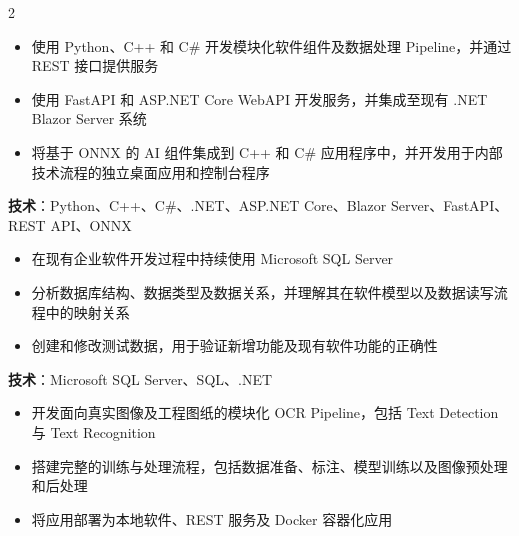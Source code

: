 \documentclass[10pt,a4paper,withhyper]{../altacv}
\begin{document}
\begin{paracol}{2}

  \vspace{1.0em}

  \begin{itemize}
    \item 使用 Python、C++ 和 C\# 开发模块化软件组件及数据处理 Pipeline，并通过 REST 接口提供服务
    \item 使用 FastAPI 和 ASP.NET Core WebAPI 开发服务，并集成至现有 .NET Blazor Server 系统
    \item 将基于 ONNX 的 AI 组件集成到 C++ 和 C\# 应用程序中，并开发用于内部技术流程的独立桌面应用和控制台程序
  \end{itemize}

  \vspace{1.0em}

  \textbf{技术}：Python、C++、C\#、.NET、ASP.NET Core、Blazor Server、FastAPI、REST API、ONNX

  \vspace{1.5em}

  \newpage


  \vspace{1.0em}

  \begin{itemize}
    \item 在现有企业软件开发过程中持续使用 Microsoft SQL Server
    \item 分析数据库结构、数据类型及数据关系，并理解其在软件模型以及数据读写流程中的映射关系
    \item 创建和修改测试数据，用于验证新增功能及现有软件功能的正确性
  \end{itemize}

  \vspace{1.0em}

  \textbf{技术}：Microsoft SQL Server、SQL、.NET

  \vspace{1.5em}


  \vspace{1.0em}

  \begin{itemize}
    \item 开发面向真实图像及工程图纸的模块化 OCR Pipeline，包括 Text Detection 与 Text Recognition
    \item 搭建完整的训练与处理流程，包括数据准备、标注、模型训练以及图像预处理和后处理
    \item 将应用部署为本地软件、REST 服务及 Docker 容器化应用
  \end{itemize}


\end{paracol}
\end{document}
